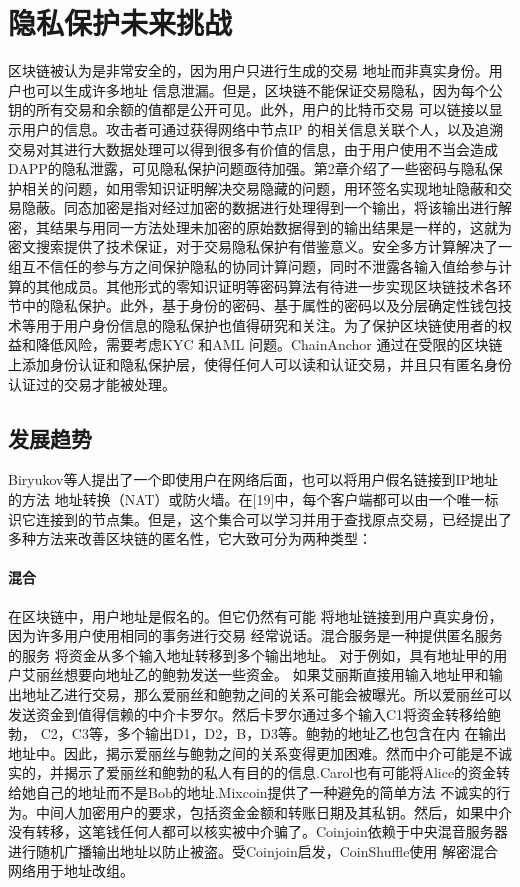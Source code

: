 \documentclass[UTF8,a4paper,10pt, twocolumn]{ctexart}
\begin{document}
\section{隐私保护未来挑战}
区块链被认为是非常安全的，因为用户只进行生成的交易 地址而非真实身份。用户也可以生成许多地址 信息泄漏。但是，区块链不能保证交易隐私，因为每个公钥的所有交易和余额的值都是公开可见。此外，用户的比特币交易 可以链接以显示用户的信息。攻击者可通过获得网络中节点IP 的相关信息关联个人，以及追溯交易对其进行大数据处理可以得到很多有价值的信息，由于用户使用不当会造成DAPP的隐私泄露，可见隐私保护问题亟待加强。第2章介绍了一些密码与隐私保护相关的问题，如用零知识证明解决交易隐藏的问题，用环签名实现地址隐蔽和交易隐蔽。同态加密是指对经过加密的数据进行处理得到一个输出，将该输出进行解密，其结果与用同一方法处理未加密的原始数据得到的输出结果是一样的，这就为密文搜索提供了技术保证，对于交易隐私保护有借鉴意义。安全多方计算解决了一组互不信任的参与方之间保护隐私的协同计算问题，同时不泄露各输入值给参与计算的其他成员。其他形式的零知识证明等密码算法有待进一步实现区块链技术各环节中的隐私保护。此外，基于身份的密码、基于属性的密码以及分层确定性钱包技术等用于用户身份信息的隐私保护也值得研究和关注。为了保护区块链使用者的权益和降低风险，需要考虑KYC 和AML 问题。ChainAnchor 通过在受限的区块链上添加身份认证和隐私保护层，使得任何人可以读和认证交易，并且只有匿名身份认证过的交易才能被处理。
\subsection{发展趋势}
Biryukov等人提出了一个即使用户在网络后面，也可以将用户假名链接到IP地址的方法 地址转换（NAT）或防火墙。在[19]中，每个客户端都可以由一个唯一标识它连接到的节点集。但是，这个集合可以学习并用于查找原点交易，已经提出了多种方法来改善区块链的匿名性，它大致可分为两种类型：
\paragraph{混合}在区块链中，用户地址是假名的。但它仍然有可能 将地址链接到用户真实身份，因为许多用户使用相同的事务进行交易 经常说话。混合服务是一种提供匿名服务的服务 将资金从多个输入地址转移到多个输出地址。 对于例如，具有地址甲的用户艾丽丝想要向地址乙的鲍勃发送一些资金。 如果艾丽斯直接用输入地址甲和输出地址乙进行交易，那么爱丽丝和鲍勃之间的关系可能会被曝光。所以爱丽丝可以发送资金到值得信赖的中介卡罗尔。然后卡罗尔通过多个输入C1将资金转移给鲍勃， C2，C3等，多个输出D1，D2，B，D3等。鲍勃的地址乙也包含在内 在输出地址中。因此，揭示爱丽丝与鲍勃之间的关系变得更加困难。然而中介可能是不诚实的，并揭示了爱丽丝和鲍勃的私人有目的的信息.Carol也有可能将Alice的资金转给她自己的地址而不是Bob的地址.Mixcoin提供了一种避免的简单方法 不诚实的行为。中间人加密用户的要求，包括资金金额和转账日期及其私钥。然后，如果中介没有转移，这笔钱任何人都可以核实被中介骗了。Coinjoin依赖于中央混音服务器进行随机广播输出地址以防止被盗。受Coinjoin启发，CoinShuffle使用 解密混合网络用于地址改组。
\end{document}
